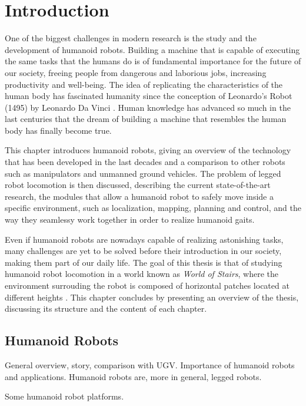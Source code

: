 \chapter{Introduction}
One of the biggest challenges in modern research is the study and the 
development of humanoid robots. Building a machine that is capable of executing 
the same tasks that the humans do is of fundamental importance for the future 
of our society, freeing people from dangerous and laborious jobs, increasing 
productivity and well-being. The idea of replicating the characteristics of 
the human body has fascinated humanity since the conception of Leonardo's
Robot (1495) by Leonardo Da Vinci \cite{Moran2007TheDaVinciRobot}. Human 
knowledge has advanced so much in the last centuries that the dream of 
building a machine that resembles the human body has finally become true.

This chapter introduces humanoid robots, giving an overview of the technology 
that has been developed in the last decades and a comparison to other robots
such as manipulators and unmanned ground vehicles. The problem of legged 
robot locomotion is then discussed, describing the current state-of-the-art 
research, the modules that allow a 
humanoid robot to safely move inside a specific environment, such as 
localization, mapping, planning and control, and the way they seamlessy work
together in order to realize humanoid gaits.

Even if humanoid robots are nowadays capable of realizing astonishing tasks,
many challenges are yet to be solved before their introduction in our 
society, making them part of our daily life. The goal of this thesis is that 
of studying humanoid robot locomotion in a world known as \textit{World of 
Stairs}, where the environment surrouding the robot is composed of 
horizontal patches located at different heights \cite{ECC19}. This chapter 
concludes by presenting an overview of the thesis, discussing its 
structure and the content of each chapter. 

\section{Humanoid Robots}
General overview, story, comparison with UGV. Importance of humanoid robots 
and applications. Humanoid robots are, more in 
general, legged robots.

Some humanoid robot platforms.

